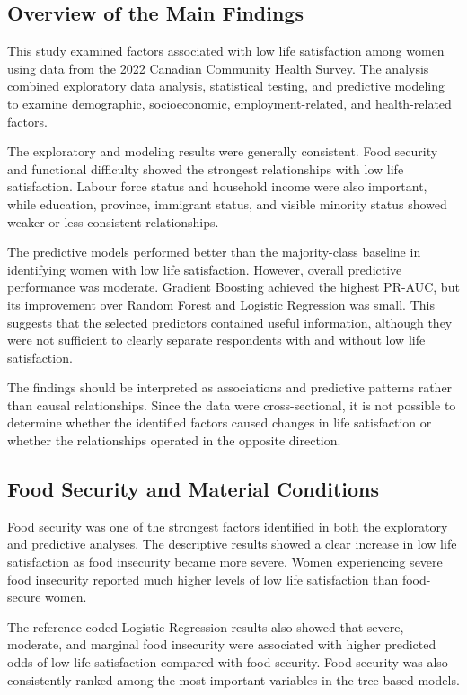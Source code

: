 \documentclass[12pt]{article}
\begin{document}
\subsection{Overview of the Main Findings}

This study examined factors associated with low life satisfaction among women using data from the 2022 Canadian Community Health Survey. The analysis combined exploratory data analysis, statistical testing, and predictive modeling to examine demographic, socioeconomic, employment-related, and health-related factors.

The exploratory and modeling results were generally consistent. Food security and functional difficulty showed the strongest relationships with low life satisfaction. Labour force status and household income were also important, while education, province, immigrant status, and visible minority status showed weaker or less consistent relationships.

The predictive models performed better than the majority-class baseline in identifying women with low life satisfaction. However, overall predictive performance was moderate. Gradient Boosting achieved the highest PR-AUC, but its improvement over Random Forest and Logistic Regression was small. This suggests that the selected predictors contained useful information, although they were not sufficient to clearly separate respondents with and without low life satisfaction.

The findings should be interpreted as associations and predictive patterns rather than causal relationships. Since the data were cross-sectional, it is not possible to determine whether the identified factors caused changes in life satisfaction or whether the relationships operated in the opposite direction.

\subsection{Food Security and Material Conditions}

Food security was one of the strongest factors identified in both the exploratory and predictive analyses. The descriptive results showed a clear increase in low life satisfaction as food insecurity became more severe. Women experiencing severe food insecurity reported much higher levels of low life satisfaction than food-secure women.

The reference-coded Logistic Regression results also showed that severe, moderate, and marginal food insecurity were associated with higher predicted odds of low life satisfaction compared with food security. Food security was also consistently ranked among the most important variables in the tree-based models.
\end{document}
